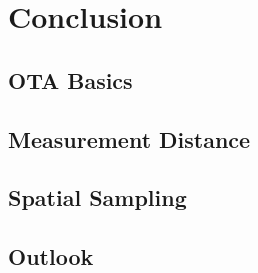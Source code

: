 \chapter{Conclusion}

\section{OTA Basics}

\section{Measurement Distance}

\section{Spatial Sampling}

\section{Outlook}